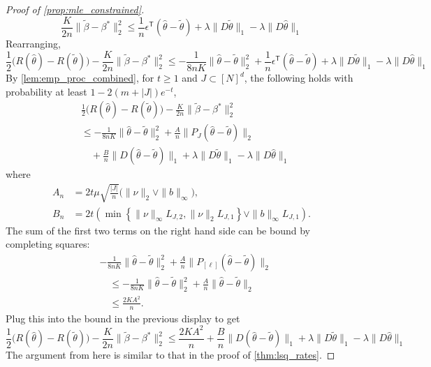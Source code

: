 \documentclass[ejs,noshowframe]{imsart}
\theoremstyle{plain}
\theoremstyle{definition}
\renewcommand{\hat}{\widehat}
\renewcommand{\top}{\mathsf{T}}
\renewcommand{\tilde}{\widetilde}
\begin{document}
\begin{appendix}
\begin{proof}[Proof of \autoref{prop:mle_constrained}]
\begin{equation}
		\frac{K}{2n} \| \tilde \beta -\beta^*\|_2^2
		\leq \frac{1}{n} \epsilon^\top (\hat\theta - \tilde\theta) + \lambda 
		\|D\tilde\theta\|_1 - \lambda \|D\hat\theta\|_1
	\end{equation}
	Rearranging,
	\begin{equation}
		\frac{1}{2} \big( R(\hat\theta) - R(\tilde\theta) \big) - \frac{K}{2n} \| 
		\tilde\beta - \beta^* \|_2^2 
		\leq -  \frac{1}{8nK} \| \hat \theta - \tilde \theta \|_2^2 + \frac{1}{n} 
		\epsilon^\top (\hat\theta - \tilde\theta) + \lambda \|D\tilde\theta\|_1 - 
		\lambda 
		\|D\hat\theta\|_1
	\end{equation}
	By \autoref{lem:emp_proc_combined}, for $t\geq 1$ and $J \subset [N]^d$, 
	the following holds with probability at least $1-2(m+|J|)e^{-t}$,
	\begin{align}
		&\frac{1}{2} \big( R(\hat\theta) - R(\tilde\theta) \big) - \frac{K}{2n} \| 
		\tilde\beta - \beta^* \|_2^2\\
		&\leq 
		-  \frac{1}{8nK} \| \hat \theta - \tilde \theta \|_2^2 + \frac{A}{n}  \| 
		P_{J} (\hat\theta-\tilde\theta) \|_2 \\
		&\quad+ \frac{B}{n}  \| D (\hat\theta-\tilde\theta) \|_1
		+ \lambda \| D\tilde \theta\|_1 - \lambda \| D\hat\theta\|_1
	\end{align}
	where
	\begin{align}
	A_n &= 2t\mu \sqrt{\frac{|J|}{n}} \big( \| \nu \|_2 \vee \|b\|_\infty\big),\\
	B_n &= 2t\left( 
	\min\left\{ \|\nu\|_\infty  L_{J,2}, 
	\|\nu\|_2 L_{J,1} \right\}
	\vee  \| b \|_\infty L_{J,1}\right).
	\end{align}
	The sum of the first two terms on the right hand side can be bound by 
	completing squares:
	\begin{align}
		&-  \frac{1}{8nK} \| \hat \theta - \tilde \theta \|_2^2 + \frac{A}{n}  \| 
		P_{[\ell]} (\hat\theta-\tilde\theta) \|_2\\
		&\quad\leq 
		-  \frac{1}{8nK} \| \hat \theta - \tilde \theta \|_2^2 + \frac{A}{n} \| 
		\hat\theta-\tilde\theta \|_2\\
		&\quad\leq \frac{2 K A^2}{n}.
	\end{align}
	Plug this into the bound in the previous display to get
	\begin{equation*}
		\frac{1}{2} \big( R(\hat\theta) - R(\tilde\theta) \big) - \frac{K}{2n} \| 
		\tilde\beta - \beta^* \|_2^2 
		\leq 
		\frac{2KA^2}{n} + \frac{B}{n} \| D (\hat\theta-\tilde\theta) \|_1
		+ \lambda \| D\tilde \theta\|_1 - \lambda \| D\hat\theta\|_1 
	\end{equation*}
	The argument from here is similar to that in the proof of 
	\autoref{thm:lsq_rates}.
\end{proof}





\end{appendix}
\end{document}

